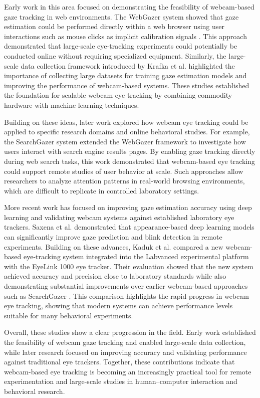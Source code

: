 \documentclass[12pt]{article}
\begin{document}
Early work in this area focused on demonstrating the feasibility of webcam-based gaze tracking in web environments. The WebGazer system \cite{papoutsaki2016webgazer} showed that gaze estimation could be performed directly within a web browser using user interactions such as mouse clicks as implicit calibration signals . This approach demonstrated that large-scale eye-tracking experiments could potentially be conducted online without requiring specialized equipment. Similarly, the large-scale data collection framework introduced by Krafka et al. \cite{krafka2016eye} highlighted the importance of collecting large datasets for training gaze estimation models and improving the performance of webcam-based systems. These studies established the foundation for scalable webcam eye tracking by combining commodity hardware with machine learning techniques.

Building on these ideas, later work explored how webcam eye tracking could be applied to specific research domains and online behavioral studies. For example, the SearchGazer system \cite{papoutsaki2017searchgazer} extended the WebGazer framework \cite{papoutsaki2016webgazer} to investigate how users interact with search engine results pages. By enabling gaze tracking directly during web search tasks, this work demonstrated that webcam-based eye tracking could support remote studies of user behavior at scale. Such approaches allow researchers to analyze attention patterns in real-world browsing environments, which are difficult to replicate in controlled laboratory settings.

More recent work has focused on improving gaze estimation accuracy using deep learning and validating webcam systems against established laboratory eye trackers. Saxena et al. \cite{saxena2024deep} demonstrated that appearance-based deep learning models can significantly improve gaze prediction and blink detection in remote experiments. Building on these advances, Kaduk et al. \cite{kaduk2024webcam} compared a new webcam-based eye-tracking system integrated into the Labvanced experimental platform with the EyeLink 1000 eye tracker. Their evaluation showed that the new system achieved accuracy and precision close to laboratory standards while also demonstrating substantial improvements over earlier webcam-based approaches such as SearchGazer \cite{papoutsaki2017searchgazer}. This comparison highlights the rapid progress in webcam eye tracking, showing that modern systems can achieve performance levels suitable for many behavioral experiments.

Overall, these studies show a clear progression in the field. Early work established the feasibility of webcam gaze tracking and enabled large-scale data collection, while later research focused on improving accuracy and validating performance against traditional eye trackers. Together, these contributions indicate that webcam-based eye tracking is becoming an increasingly practical tool for remote experimentation and large-scale studies in human–computer interaction and behavioral research.


\end{document}
